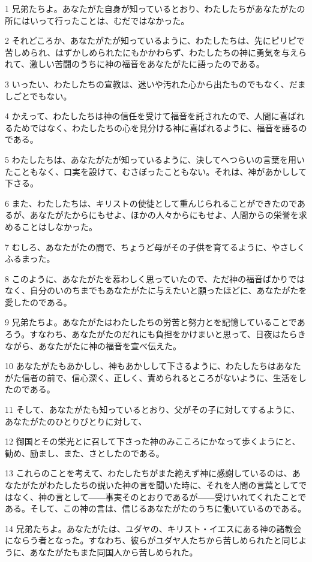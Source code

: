 \par 1 兄弟たちよ。あなたがた自身が知っているとおり、わたしたちがあなたがたの所にはいって行ったことは、むだではなかった。
\par 2 それどころか、あなたがたが知っているように、わたしたちは、先にピリピで苦しめられ、はずかしめられたにもかかわらず、わたしたちの神に勇気を与えられて、激しい苦闘のうちに神の福音をあなたがたに語ったのである。
\par 3 いったい、わたしたちの宣教は、迷いや汚れた心から出たものでもなく、だましごとでもない。
\par 4 かえって、わたしたちは神の信任を受けて福音を託されたので、人間に喜ばれるためではなく、わたしたちの心を見分ける神に喜ばれるように、福音を語るのである。
\par 5 わたしたちは、あなたがたが知っているように、決してへつらいの言葉を用いたこともなく、口実を設けて、むさぼったこともない。それは、神があかしして下さる。
\par 6 また、わたしたちは、キリストの使徒として重んじられることができたのであるが、あなたがたからにもせよ、ほかの人々からにもせよ、人間からの栄誉を求めることはしなかった。
\par 7 むしろ、あなたがたの間で、ちょうど母がその子供を育てるように、やさしくふるまった。
\par 8 このように、あなたがたを慕わしく思っていたので、ただ神の福音ばかりではなく、自分のいのちまでもあなたがたに与えたいと願ったほどに、あなたがたを愛したのである。
\par 9 兄弟たちよ。あなたがたはわたしたちの労苦と努力とを記憶していることであろう。すなわち、あなたがたのだれにも負担をかけまいと思って、日夜はたらきながら、あなたがたに神の福音を宣べ伝えた。
\par 10 あなたがたもあかしし、神もあかしして下さるように、わたしたちはあなたがた信者の前で、信心深く、正しく、責められるところがないように、生活をしたのである。
\par 11 そして、あなたがたも知っているとおり、父がその子に対してするように、あなたがたのひとりびとりに対して、
\par 12 御国とその栄光とに召して下さった神のみこころにかなって歩くようにと、勧め、励まし、また、さとしたのである。
\par 13 これらのことを考えて、わたしたちがまた絶えず神に感謝しているのは、あなたがたがわたしたちの説いた神の言を聞いた時に、それを人間の言葉としてではなく、神の言として――事実そのとおりであるが――受けいれてくれたことである。そして、この神の言は、信じるあなたがたのうちに働いているのである。
\par 14 兄弟たちよ。あなたがたは、ユダヤの、キリスト・イエスにある神の諸教会にならう者となった。すなわち、彼らがユダヤ人たちから苦しめられたと同じように、あなたがたもまた同国人から苦しめられた。
